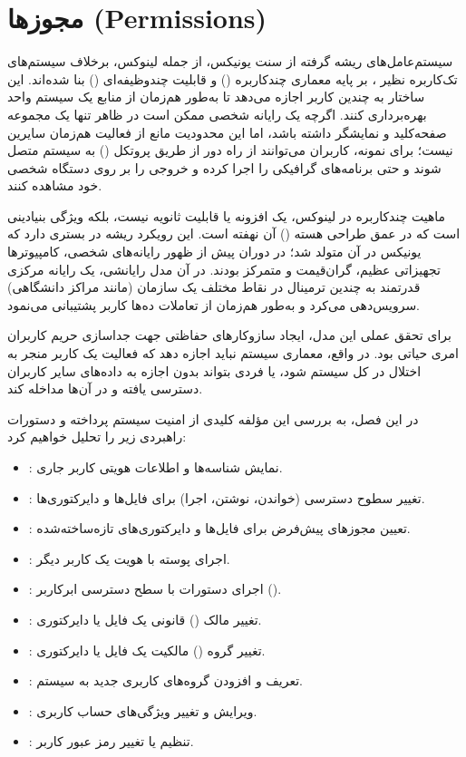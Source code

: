 \chapter{مجوزها (Permissions)}

سیستم‌عامل‌های ریشه گرفته از سنت یونیکس، از جمله لینوکس، برخلاف سیستم‌های تک‌کاربره نظیر ، بر پایه معماری چندکاربره () و قابلیت چندوظیفه‌ای () بنا شده‌اند. این ساختار به چندین کاربر اجازه می‌دهد تا به‌طور هم‌زمان از منابع یک سیستم واحد بهره‌برداری کنند. اگرچه یک رایانه شخصی ممکن است در ظاهر تنها یک مجموعه صفحه‌کلید و نمایشگر داشته باشد، اما این محدودیت مانع از فعالیت هم‌زمان سایرین نیست؛ برای نمونه، کاربران می‌توانند از راه دور از طریق پروتکل  () به سیستم متصل شوند و حتی برنامه‌های گرافیکی را اجرا کرده و خروجی را بر روی دستگاه شخصی خود مشاهده کنند.

ماهیت چندکاربره در لینوکس، یک افزونه یا قابلیت ثانویه نیست، بلکه ویژگی بنیادینی است که در عمق طراحی هسته () آن نهفته است. این رویکرد ریشه در بستری دارد که یونیکس در آن متولد شد؛ در دوران پیش از ظهور رایانه‌های شخصی، کامپیوترها تجهیزاتی عظیم، گران‌قیمت و متمرکز بودند. در آن مدل رایانشی، یک رایانه مرکزی قدرتمند به چندین ترمینال در نقاط مختلف یک سازمان (مانند مراکز دانشگاهی) سرویس‌دهی می‌کرد و به‌طور هم‌زمان از تعاملات ده‌ها کاربر پشتیبانی می‌نمود.

برای تحقق عملی این مدل، ایجاد سازوکارهای حفاظتی جهت جداسازی حریم کاربران امری حیاتی بود. در واقع، معماری سیستم نباید اجازه دهد که فعالیت یک کاربر منجر به اختلال در کل سیستم شود، یا فردی بتواند بدون اجازه به داده‌های سایر کاربران دسترسی یافته و در آن‌ها مداخله کند.

در این فصل، به بررسی این مؤلفه کلیدی از امنیت سیستم پرداخته و دستورات راهبردی زیر را تحلیل خواهیم کرد:

\begin{itemize}
  \item {}: نمایش شناسه‌ها و اطلاعات هویتی کاربر جاری.
  \item {}: تغییر سطوح دسترسی (خواندن، نوشتن، اجرا) برای فایل‌ها و دایرکتوری‌ها.
  \item {}: تعیین مجوزهای پیش‌فرض برای فایل‌ها و دایرکتوری‌های تازه‌ساخته‌شده.
  \item {}: اجرای پوسته با هویت یک کاربر دیگر.
  \item {}: اجرای دستورات با سطح دسترسی ابرکاربر ().
  \item {}: تغییر مالک () قانونی یک فایل یا دایرکتوری.
  \item {}: تغییر گروه () مالکیت یک فایل یا دایرکتوری.
  \item {}: تعریف و افزودن گروه‌های کاربری جدید به سیستم.
  \item {}: ویرایش و تغییر ویژگی‌های حساب کاربری.
  \item {}: تنظیم یا تغییر رمز عبور کاربر.
\end{itemize}

